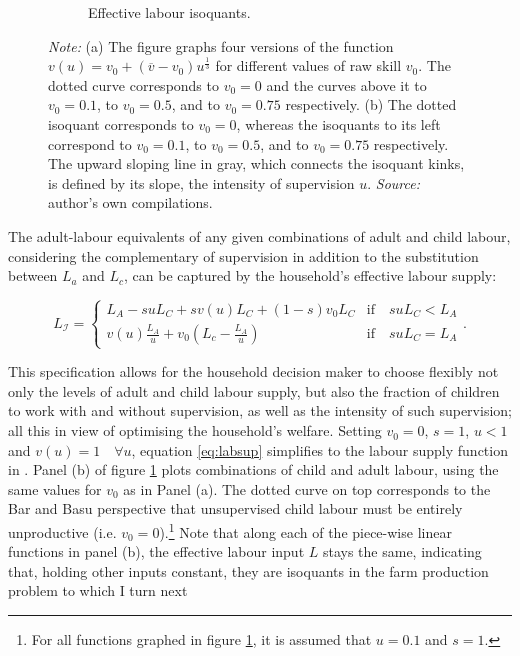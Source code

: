 \documentclass[a4paper,12pt]{article}
\theoremstyle{plain}
\theoremstyle{definition}
\theoremstyle{definition}
\theoremstyle{definition}
\theoremstyle{definition}
\begin{document}
\begin{figure}[t!]
\begin{subfigure}[t]{0.45\textwidth}
        \caption{Effective labour isoquants.}
    \end{subfigure}
    \caption*{\footnotesize{\textit{Note:} (a) The figure graphs four versions of the function $v(u)=v_0+(\overline{v}-v_0)u^{\frac{1}{3}}$ for different values of raw skill $v_0$. The dotted curve corresponds to $v_0=0$ and the curves above it to $v_0=0.1$, to $v_0=0.5$, and to $v_0=0.75$ respectively. (b) The dotted isoquant corresponds to $v_0=0$, whereas the isoquants to its left correspond to $v_0=0.1$, to $v_0=0.5$, and to $v_0=0.75$ respectively. The upward sloping line in gray, which connects the isoquant kinks, is defined by its slope, the intensity of supervision $u$. \textit{Source:}  author's own compilations.}}
    \label{fig:model}
\end{figure}


The adult-labour equivalents of any given combinations of adult and child labour, considering the complementary of supervision in addition to the substitution between $L_a$ and $L_c$, can be captured by the household's effective labour supply:

\begin{equation}
\label{eq:labsup}
    L_{\mathcal{I}} =
        \begin{cases}
            L_A - s u L_C + s v(u) L_C + (1-s) v_0 L_C & \text{if} \quad s u L_C < L_A \\
            v(u) \frac{L_A}{u} + v_0 \left(L_c - \frac{L_A}{u}\right) \quad & \text {if} \quad s u L_C = L_A
        \end{cases}
        .
\end{equation}

This specification allows for the household decision maker to choose flexibly not only the levels of adult and child labour supply, but also the fraction of children to work with and without supervision, as well as the intensity of such supervision; all this in view of optimising the household's welfare. Setting $v_0=0$, $s=1$, $u<1$ and $v(u)=1 \quad \forall u$, equation \ref{eq:labsup} simplifies to the labour supply function in \citet{Bar2009}. Panel (b) of figure \ref{fig:model} plots combinations of child and adult labour, using the same values for $v_0$ as in Panel (a). The dotted curve on top corresponds to the Bar and Basu perspective that unsupervised child labour must be entirely unproductive (i.e. $v_0=0$).\footnote{For all functions graphed in figure \ref{fig:model}, it is assumed that $u=0.1$ and $s=1$.} Note that along each of the piece-wise linear functions in panel (b), the effective labour input $L$ stays the same, indicating that, holding other inputs constant, they are isoquants in the farm production problem to which I turn next 
\end{document}
